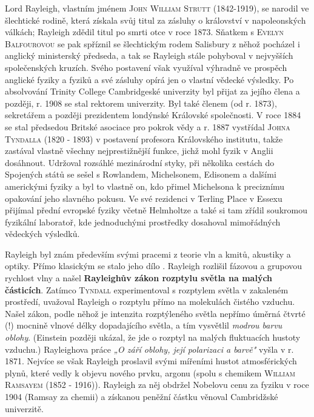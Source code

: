         \begin{tcnote}
          Lord Rayleigh, vlastním jménem \textsc{John William Strutt} (1842-1919), se narodil ve
          šlechtické rodině, která získala svůj titul za zásluhy o království v napoleonských
          válkách; Rayleigh zdědil titul po smrti otce v roce 1873. Sňatkem s \textsc{Evelyn
          Balfourovou} se pak spříznil se šlechtickým rodem Salisbury z něhož pocházel i anglický
          ministerský předseda, a tak se Rayleigh stále pohyboval v nejvyšších společenských
          kruzích. Svého postavení však využíval výhradně ve prospěch anglické fyziky a fyziků a své
          zásluhy opírá jen o vlastní vědecké výsledky. Po absolvování Trinity College Cambridgeské
          univerzity byl přijat za jejího člena a později, r. 1908 se stal rektorem univerzity. Byl
          také členem (od r. 1873), sekretářem a později prezidentem londýnské Královské
          společnosti. V roce 1884 se stal předsedou Britské asociace pro pokrok vědy a r. 1887
          vystřídal \textsc{Johna Tyndalla} (1820 - 1893) v postavení profesora Královského
          institutu, takže zastával vlastně všechny nejprestižnější funkce, jichž mohl fyzik v
          Anglii dosáhnout. Udržoval rozsáhlé mezinárodní styky, při několika cestách do Spojených
          států se sešel s Rowlandem, Michelsonem, Edisonem a dalšími americkými fyziky a byl to
          vlastně on, kdo přimel Michelsona k preciznímu opakování jeho slavného pokusu. Ve své
          rezidenci v Terling Place v Essexu přijímal přední evropské fyziky včetně Helmholtze a
          také si tam zřídil soukromou fyzikální laboratoř, kde jednoduchými prostředky dosahoval
          mimořádných vědeckých výsledků.
        \end{tcnote}
        
        Rayleigh byl znám především svými pracemi z teorie vln a kmitů, akustiky a optiky. Přímo
        klasickým se stalo jeho dílo \emph{}. Rayleigh rozlišil fázovou a grupovou
        rychlost vlny a našel \textbf{Rayleighův zákon rozptylu světla na malých částicích}. Zatímco
        \textsc{Tyndall} experimentoval s rozptylem světla v zakaleném prostředí, uvažoval Rayleigh
        o rozptylu přímo na molekulách čistého vzduchu. Našel zákon, podle něhož je intenzita
        rozptýleného světla nepřímo úměrná čtvrté (!) mocnině vlnové délky dopadajícího světla, a
        tím vysvětlil \emph{modrou barvu oblohy}. (Einstein později ukázal, že jde o rozptyl na
        malých fluktuacích hustoty vzduchu.) Rayleighova práce \emph{„O září oblohy, její polarizaci
        a barvě"} vyšla v r. 1871. Nejvíce se však Rayleigh proslavil svými mířeními hustot
        atmosférických plynů, které vedly k objevu nového prvku, argonu (spolu s chemikem
        \textsc{William Ramsayem} (1852 - 1916)). Rayleigh za něj obdržel Nobelovu cenu za fyziku v
        roce 1904 (Ramsay za chemii) a získanou peněžní částku věnoval Cambridžské univerzitě.

